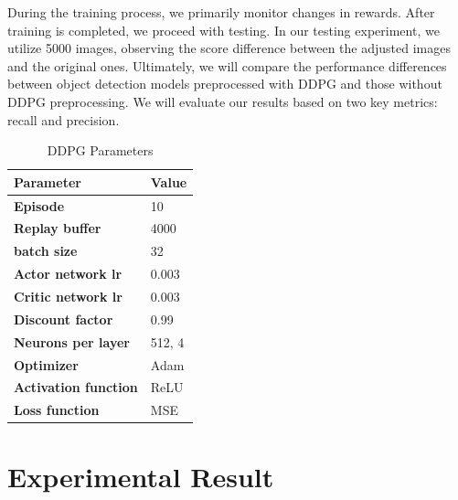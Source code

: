 \documentclass[PhD]{PHlab-thesis}
\begin{document}
During the training process, we primarily monitor changes in rewards. After training is completed, we proceed with testing. In our testing experiment, we utilize 5000 images, observing the score difference between the adjusted images and the original ones. Ultimately, we will compare the performance differences between object detection models preprocessed with DDPG and those without DDPG preprocessing. We will evaluate our results based on two key metrics: recall and precision.

\begin{table}[H]
	\centering
	\caption{DDPG Parameters}
        \label{Fig.DDPG parameter} 
	\begin{tabular}{p{5cm}p{5cm}}
		\toprule  %
		\textbf{Parameter}   &\textbf{Value}  \\
		\midrule  %
		\textbf{Episode}    & 10 \\
		\textbf{Replay buffer} & 4000   \\
		\textbf{batch size} & 32  \\
		\textbf{Actor network lr} & 0.003  \\
		\textbf{Critic network lr}   & 0.003 \\
		\textbf{Discount factor}   & 0.99 \\
		\textbf{Neurons per layer}   & 512, 4 \\
		\textbf{Optimizer}   & Adam \\
		\textbf{Activation function}   & ReLU \\
		\textbf{Loss function}   & MSE \\
		\bottomrule %
	\end{tabular}
\end{table} 

\section{Experimental Result}
\end{document}
